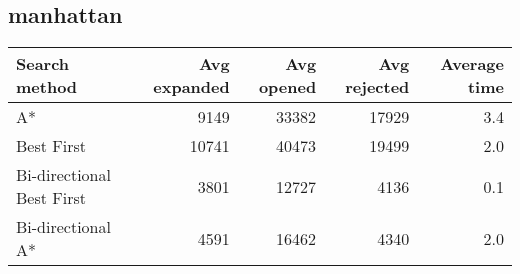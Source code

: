 \documentclass[11pt]{article}
\begin{document}
\subsection{manhattan}
\label{sec-2-1}



\begin{center}
\begin{tabular}{lrrrr}
 Search method              &  Avg expanded  &  Avg opened  &  Avg rejected  &  Average time  \\
\hline
 A*                         &          9149  &       33382  &         17929  &           3.4  \\
 Best First                 &         10741  &       40473  &         19499  &           2.0  \\
 Bi-directional Best First  &          3801  &       12727  &          4136  &           0.1  \\
 Bi-directional A*          &          4591  &       16462  &          4340  &           2.0  \\
\end{tabular}
\end{center}
\end{document}
